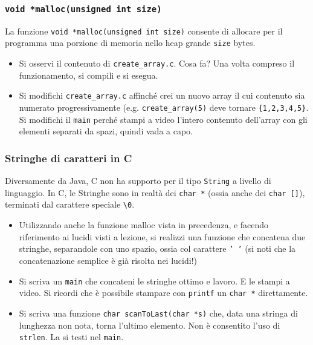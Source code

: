 \documentclass{beamer}
\begin{document}
\begin{frame}
\frametitle{\texttt{void *malloc(unsigned int size)}}
La funzione \texttt{void *malloc(unsigned int size)} consente di allocare per il programma una porzione di memoria nello heap grande \texttt{size} bytes.
\begin{itemize}
 \item Si osservi il contenuto di \texttt{create\_array.c}. Cosa fa? Una volta compreso il funzionamento, si compili e si esegua.
 \item Si modifichi \texttt{create\_array.c} affinché crei un nuovo array il cui contenuto sia numerato progressivamente (e.g. \texttt{create\_array(5)} deve tornare \texttt{\{1,2,3,4,5\}}. Si modifichi il \texttt{main} perché stampi a video l'intero contenuto dell'array con gli elementi separati da spazi, quindi vada a capo.
\end{itemize}
\end{frame}

\begin{frame}
\frametitle{Stringhe di caratteri in C}
Diversamente da Java, C non ha supporto per il tipo \texttt{String} a livello di linguaggio. In C, le Stringhe sono in realtà dei \texttt{char *} (ossia anche dei \texttt{char []}), terminati dal carattere speciale \texttt{\textbackslash{}0}.
\begin{itemize}
 \item Utilizzando anche la funzione malloc vista in precedenza, e facendo riferimento ai lucidi visti a lezione, si realizzi una funzione che concatena due stringhe, separandole con uno spazio, ossia col carattere \texttt{' '} (si noti che la concatenazione semplice è già risolta nei lucidi!)
 \item Si scriva un \texttt{main} che concateni le stringhe \textquotedbl{}ottimo\textquotedbl{} e \textquotedbl{}lavoro\textquotedbl{}. E le stampi a video. Si ricordi che è possibile stampare con \texttt{printf} un \texttt{char *} direttamente.
 \item Si scriva una funzione \texttt{char scanToLast(char *s)} che, data una stringa di lunghezza non nota, torna l'ultimo elemento. Non è consentito l'uso di \texttt{strlen}. La si testi nel \texttt{main}.
\end{itemize}
\end{frame}
\end{document}
